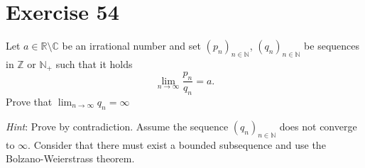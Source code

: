 \documentclass[a4paper]{article}
\theoremstyle{definition}
\newcommand\seq[1]{\left(#1\right)_{n\in\mathbb N}}
\begin{document}
\section{Exercise 54}
\begin{ex}
  Let $a \in \mathbb R \setminus \mathbb C$ be an irrational number and set $\seq{p_n}$, $\seq{q_n}$ be sequences in $\mathbb Z$ or $\mathbb N_+$ such that it holds
  \[ \lim_{n\to\infty} \frac{p_n}{q_n} = a. \]
  Prove that $\lim_{n\to\infty} q_n = \infty$

  \emph{Hint}: Prove by contradiction. Assume the sequence $\seq{q_n}$ does not converge to $\infty$.
  Consider that there must exist a bounded subsequence and use the Bolzano-Weierstrass theorem.
\end{ex}
\end{document}
